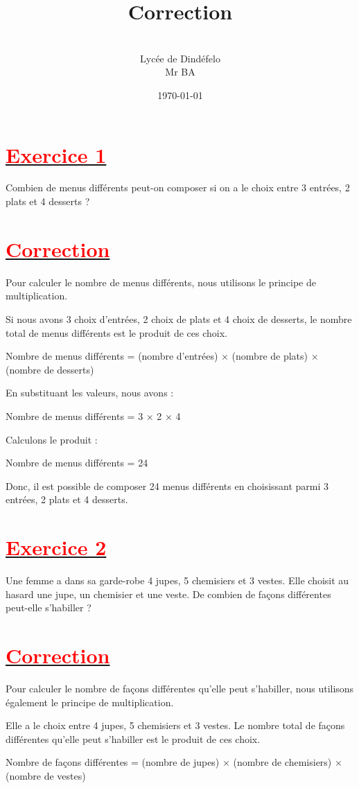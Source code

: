 \documentclass[12pt]{article}
\author{\\Lycée de Dindéfelo\\Mr BA}
\title{\textbf{Correction}}
\date{\today}
\begin{document}
\maketitle
\newpage
\section*{\underline{\textbf{\textcolor{red}{Exercice 1}}}}
Combien de menus différents peut-on composer si on a le choix entre 3 entrées, 2 plats et 4 desserts ?
\section*{\underline{\textbf{\textcolor{red}{Correction}}}}
Pour calculer le nombre de menus différents, nous utilisons le principe de multiplication.

Si nous avons 3 choix d'entrées, 2 choix de plats et 4 choix de desserts, le nombre total de menus différents est le produit de ces choix.

Nombre de menus différents = (nombre d'entrées) × (nombre de plats) ×
	 (nombre de desserts)

En substituant les valeurs, nous avons :

Nombre de menus différents = 3 × 2 × 4

Calculons le produit :

Nombre de menus différents = 24

Donc, il est possible de composer 24 menus différents en choisissant parmi 3 entrées, 2 plats et 4 desserts.
\section*{\underline{\textbf{\textcolor{red}{Exercice 2}}}}
Une femme a dans sa garde-robe 4 jupes, 5 chemisiers et 3 vestes. Elle choisit au hasard une jupe, un chemisier et une veste. De combien de façons différentes peut-elle s’habiller ?
\section*{\underline{\textbf{\textcolor{red}{Correction}}}}
Pour calculer le nombre de façons différentes qu'elle peut s'habiller, nous utilisons également le principe de multiplication.

Elle a le choix entre 4 jupes, 5 chemisiers et 3 vestes. Le nombre total de façons différentes qu'elle peut s'habiller est le produit de ces choix.

Nombre de façons différentes = (nombre de jupes) × (nombre de chemisiers) × (nombre de vestes)
\end{document}
